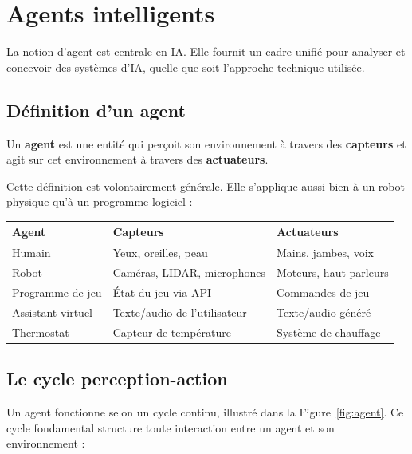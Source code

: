 \documentclass[11pt,a4paper]{article}
\begin{document}
\section{Agents intelligents}

La notion d'agent est centrale en IA. Elle fournit un cadre unifié pour analyser et concevoir des systèmes d'IA, quelle que soit l'approche technique utilisée.

\subsection{Définition d'un agent}

\begin{definitionbox}
Un \textbf{agent} est une entité qui perçoit son environnement à travers des \textbf{capteurs} et agit sur cet environnement à travers des \textbf{actuateurs}.
\end{definitionbox}

Cette définition est volontairement générale. Elle s'applique aussi bien à un robot physique qu'à un programme logiciel :

\begin{center}
\begin{tabular}{|l|l|l|}
\hline
\textbf{Agent} & \textbf{Capteurs} & \textbf{Actuateurs} \\
\hline
Humain & Yeux, oreilles, peau & Mains, jambes, voix \\
Robot & Caméras, LIDAR, microphones & Moteurs, haut-parleurs \\
Programme de jeu & État du jeu via API & Commandes de jeu \\
Assistant virtuel & Texte/audio de l'utilisateur & Texte/audio généré \\
Thermostat & Capteur de température & Système de chauffage \\
\hline
\end{tabular}
\end{center}

\subsection{Le cycle perception-action}

Un agent fonctionne selon un cycle continu, illustré dans la Figure~\ref{fig:agent}. Ce cycle fondamental structure toute interaction entre un agent et son environnement :
\end{document}

